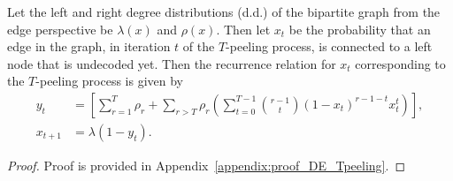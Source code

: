 \begin{lemma}
Let the left and right degree distributions (d.d.) of the bipartite graph from the edge perspective be $\lambda(x)$ and $\rho(x)$. Then let $x_{t}$ be the probability that an edge in the graph, in iteration $t$ of the $T$-peeling process, is connected to a left node that is undecoded yet. Then the recurrence relation for $x_t$ corresponding to the $T$-peeling process is given by
\begin{align}
y_{t}&=\left[\sum_{r=1}^{T} \rho_r +\sum_{r>T} \rho_r\left( \sum_{t=0}^{T-1}\binom{r-1}{t}(1-x_t)^{r-1-t} x_t^{t}\right) \right],\label{eqn:DE_Tpeeling_check}\\
x_{t+1}&=\lambda(1-y_t).\label{eqn:DE_Tpeeling_bit}
\end{align}
\label{lem:DE_Tpeeling}
\end{lemma}
\begin{proof}
Proof is provided in Appendix~\ref{appendix:proof_DE_Tpeeling}.
\end{proof}
%
